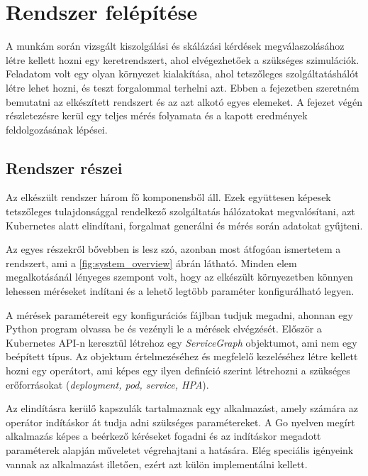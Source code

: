 \chapter{Rendszer felépítése}
\label{sec:system}
A munkám során vizsgált kiszolgálási és skálázási kérdések megválaszolásához létre kellett hozni egy keretrendszert, ahol elvégezhetőek a szükséges szimulációk.
Feladatom volt egy olyan környezet kialakítása, ahol tetszőleges szolgáltatáshálót létre lehet hozni, és teszt forgalommal terhelni azt.
Ebben a fejezetben szeretném bemutatni az elkészített rendszert és az azt alkotó egyes elemeket.
A fejezet végén részletezésre kerül egy teljes mérés folyamata és a kapott eredmények feldolgozásának lépései.

\section{Rendszer részei}
Az elkészült rendszer három fő komponensből áll. Ezek együttesen képesek tetszőleges tulajdonsággal rendelkező szolgáltatás hálózatokat megvalósítani, azt Kubernetes alatt elindítani, forgalmat generálni és mérés során adatokat gyűjteni. 

Az egyes részekről bővebben is lesz szó, azonban most átfogóan ismertetem a rendszert, ami a \ref{fig:system_overview} ábrán látható. Minden elem megalkotásánál lényeges szempont volt, hogy az elkészült környezetben könnyen lehessen méréseket indítani és a lehető legtöbb paraméter konfigurálható legyen.

A mérések paramétereit egy konfigurációs fájlban tudjuk megadni, ahonnan egy Python program olvassa be és vezényli le a mérések elvégzését.
Először a Kubernetes API-n keresztül létrehoz egy \textit{ServiceGraph} objektumot, ami nem egy beépített típus.
Az objektum értelmezéséhez és megfelelő kezeléséhez létre kellett hozni egy operátort, ami képes egy ilyen definíció szerint létrehozni a szükséges erőforrásokat (\textit{deployment, pod, service, HPA}).

Az elindításra kerülő kapszulák tartalmaznak egy alkalmazást, amely számára az operátor indításkor át tudja adni szükséges paramétereket. 
A Go nyelven megírt alkalmazás képes a beérkező kéréseket fogadni és az indításkor megadott paraméterek alapján műveletet végrehajtani a hatására.
Elég speciális igényeink vannak az alkalmazást illetően, ezért azt külön implementálni kellett.

